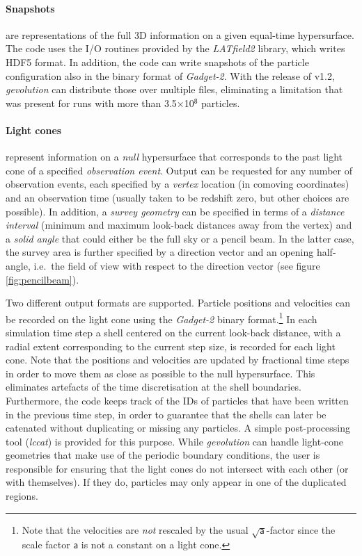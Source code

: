 \documentclass[a4paper,10pt]{article}
\begin{document}
\paragraph{Snapshots} are representations of the full 3D information on a given equal-time hypersurface. The code uses the I/O routines
provided by the \textit{LATfield2} library, which writes HDF5 format. In addition, the code can write snapshots of the particle
configuration also in the binary format of \textit{Gadget-2}. With the release of v1.2, \textit{gevolution} can distribute those over multiple
files, eliminating a limitation that was present for runs with more than 3.5$\times$10$^\mathsf{8}$ particles.

\paragraph{Light cones} represent information on a \textit{null} hypersurface that corresponds to the past light cone of a specified \textit{observation event}.
Output can be requested for any number of observation events, each specified by a \textit{vertex} location (in comoving coordinates) and an observation
time (usually taken to be redshift zero, but other choices are possible). In addition, a \textit{survey geometry} can be specified in terms of
a \textit{distance interval} (minimum and maximum look-back distances away from the vertex) and a \textit{solid angle} that could either be the full
sky or a pencil beam. In the latter case, the survey area is further specified by a direction vector and an opening half-angle, i.e.\
the field of view with respect to the direction vector (see figure \ref{fig:pencilbeam}).

Two different output formats are supported. Particle positions and velocities can be recorded on the light cone using the \textit{Gadget-2} binary
format.\footnote{Note that the velocities are \textit{not} rescaled by the usual $\sqrt{\mathsf{a}}$-factor since the scale factor $\mathsf{a}$
is not a constant on a light cone.}
In each simulation time step a shell centered on the current look-back distance, with a radial extent corresponding to the current step size, is recorded
for each light cone. Note that the positions and velocities are updated by fractional time steps in order to move them as close as possible to the
null hypersurface. This eliminates artefacts of the time discretisation at the shell boundaries. Furthermore, the code keeps track of the IDs of particles
that have been written in the previous time step, in order to guarantee that the shells can later be catenated without duplicating or missing any particles.
A simple post-processing tool (\textit{lccat}) is provided for this purpose. While \textit{gevolution} can handle light-cone geometries that make use of
the periodic boundary conditions, the user is responsible for ensuring that the light cones do not intersect with each other (or with themselves). If they do,
particles may only appear in one of the duplicated regions.
\end{document}
